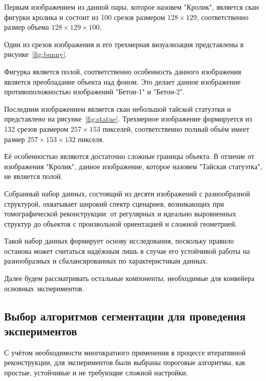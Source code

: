 Первым изображением из данной пары, которое назовем "Кролик", является скан фигурки кролика и состоит из 100 срезов размером \(128 \times 129\), соответственно размер объема \(128 \times 129 \times 100\).

Один из срезов изображения и его трехмерная визуализация представлены в рисунке~\ref{fig:bunny}.

Фигурка является полой, соответственно особенность данного изображения является преобладание объекта над фоном. Это делает данное изображение противоположностью изображений "Бетон-1" и "Бетон-2".


Последним изображением является скан небольшой тайской статуэтки и представлено на рисунке~\ref{fig:statue}. Трехмерное изображение формируется из 132 срезов размером \(257 \times 153\) пикселей, соответственно полный объём имеет размер \(257 \times 153 \times 132\) пикселя.

Её особенностью являются достаточно сложные границы объекта. В отличие от изображения "Кролик", данное изображение, которое назовем "Тайская статуэтка", не является полой.



Собранный набор данных, состоящий из десяти изображений с разнообразной структурой, охватывает широкий спектр сценариев, возникающих при томографической реконструкции: от регулярных и идеально выровненных структур до объектов с произвольной ориентацией и сложной геометрией.

Такой набор данных формирует основу исследования, поскольку правило останова может считаться надёжным лишь в случае его устойчивой работы на разнообразных и сбалансированных по характеристикам данных. 

Далее будем рассматривать остальные компоненты, необходимые для конвейера основных экспериментов.

\subsection{Выбор алгоритмов сегментации для проведения экспериментов}

С учётом необходимости многократного применения в процессе итеративной реконструкции, для экспериментов были выбраны пороговые алгоритмы, как простые, устойчивые и не требующие сложной настройки.

